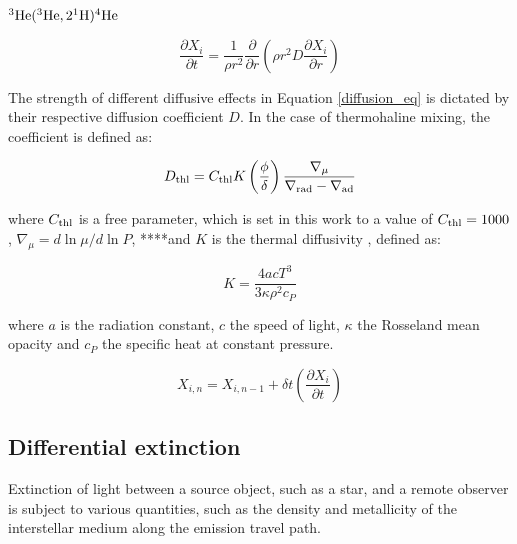 \documentclass[usenatbib]{mnras}
\begin{document}
$^{3}\textnormal{He}(^{3}\textnormal{He},2^{1}\textnormal{H})^{4}\textnormal{He}$

\begin{equation}
\frac{\partial X_{i}}{\partial t} = \frac{1}{\rho r^{2}}\frac{\partial}{\partial r} \left( \rho r^{2} D \frac{\partial X_{i}}{\partial r} \right)
\label{diffusion_eq}
\end{equation}

The strength of different diffusive effects in Equation \ref{diffusion_eq} is dictated by their respective diffusion coefficient $D$. In the case of thermohaline mixing, the coefficient is defined \cite{2010A&A...521A...9C} as:

\begin{equation}
D_{\textnormal{thl}} = C_{\textnormal{thl}} K \left( \frac{\phi}{\delta} \right) \frac{\nabla _{\mu}}{\nabla _{\textnormal{rad}} - \nabla _{\textnormal{ad}}}
\label{Dthl_def}
\end{equation}

where $C_{\textnormal{thl}}$ is a free parameter, which is set in this work to a value of $C_{\textnormal{thl}} = 1000$, $\nabla _{\mu} = d\ln\mu / d\ln P$,  ****and $K$ is the thermal diffusivity \citep{2017RSOS....470192S}, defined as:

\begin{equation}
K = \frac{4acT^{3}}{3\kappa\rho ^{2}c_{P}}
\label{diffusivity_def}
\end{equation}

where $a$ is the radiation constant, $c$ the speed of light, $\kappa$ the Rosseland mean opacity and $c_{P}$ the specific heat at constant pressure.

\begin{equation}
X_{i,n} = X_{i,n-1} + \delta t \left( \frac{\partial X_{i}}{\partial t}\right)
\label{iter_timeind}
\end{equation}

%


\subsection{Differential extinction}
Extinction of light between a source object, such as a star, and a remote observer is subject to various quantities, such as the density and metallicity of the interstellar medium along the emission travel path.
\end{document}
